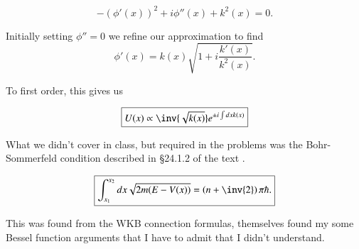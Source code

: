 \begin{equation}\label{eqn:qmTwoReview:690}
- (\phi'(x))^2 + i \phi''(x) + k^2(x) = 0.
\end{equation}

Initially setting $\phi'' = 0$ we refine our approximation to find
\begin{equation}\label{eqn:qmTwoReview:710}
\phi'(x) 
= k(x) \sqrt{ 1 + i \frac{k'(x)}{k^2(x)} } .
\end{equation}

To first order, this gives us

\begin{equation}\label{eqn:qmTwoReview:730}
\boxed{
U(x) \propto \inv{\sqrt{k(x)}} e^{\pm i \int dx k(x)} 
}
\end{equation}

What we didn't cover in class, but required in the problems was the Bohr-Sommerfeld condition described in \S 24.1.2 of the text \cite{desai2009quantum}.

\begin{equation}\label{eqn:qmTwoReview:730b}
\boxed{
\int_{x_1}^{x_2} dx \sqrt{ 2m (E - V(x))} = \left( n + \inv{2} \right) \pi \hbar.
}
\end{equation}

This was found from the WKB connection formulas, themselves found my some Bessel function arguments that I have to admit that I didn't understand.

%

\EndArticle
